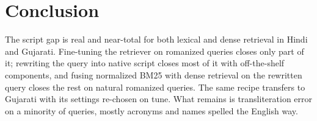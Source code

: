 \documentclass[11pt,a4paper]{article}
\begin{document}
\section{Conclusion}

The script gap is real and near-total for both lexical and dense retrieval in Hindi and
Gujarati. Fine-tuning the retriever on romanized queries closes only part of it; rewriting
the query into native script closes most of it with off-the-shelf components, and fusing
normalized BM25 with dense retrieval on the rewritten query closes the rest on natural
romanized queries. The same recipe transfers to Gujarati with its settings re-chosen on tune.
What remains is transliteration error on a minority of queries, mostly acronyms and names
spelled the English way.



\end{document}
